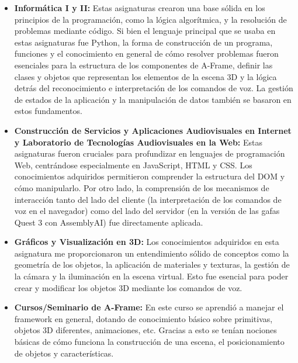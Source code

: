 \documentclass[a4paper, 12pt]{book}
\begin{document}
\begin{itemize}
  \item \textbf{Informática I y II:} Estas asignaturas crearon una base sólida en los principios de la programación, como la lógica algorítmica, y la resolución de problemas mediante código.
  Si bien el lenguaje principal que se usaba en estas asignaturas fue Python, la forma de construcción de un programa, funciones y el conocimiento en general de cómo resolver problemas fueron esenciales para la estructura de los componentes de A-Frame, definir las clases y objetos que representan los elementos de la escena 3D y la lógica detrás del reconocimiento e interpretación de los comandos de voz. La gestión de estados de la aplicación y la manipulación de datos también se basaron en estos fundamentos.
  \item \textbf{Construcción de Servicios y Aplicaciones Audiovisuales en Internet y Laboratorio de Tecnologías Audiovisuales en la Web:}
  Estas asignaturas fueron cruciales para profundizar en lenguajes de programación Web, centrándose especialmente en JavaScript, HTML y CSS.
  Los conocimientos adquiridos permitieron comprender la estructura del DOM y cómo manipularlo. Por otro lado, la comprensión de los mecanismos de interacción tanto del lado del cliente (la interpretación de los comandos de voz en el navegador) como del lado del servidor (en la versión de las gafas Quest 3 con AssemblyAI) fue directamente aplicada.
  \item \textbf{Gráficos y Visualización en 3D:} Los conocimientos adquiridos en esta asignatura me proporcionaron un entendimiento sólido de conceptos como la geometría de los objetos, la aplicación de materiales y texturas, la gestión de la cámara y la iluminación en la escena virtual. Esto fue esencial para poder crear y modificar los objetos 3D mediante los comandos de voz.
  \item \textbf{Cursos/Seminario de A-Frame:} En este curso se aprendió a manejar el framework en general, dotando de conocimiento básico sobre primitivas, objetos 3D diferentes, animaciones, etc. Gracias a esto se tenían nociones básicas de cómo funciona la construcción de una escena, el posicionamiento de objetos y características.
\end{itemize}
\end{document}
